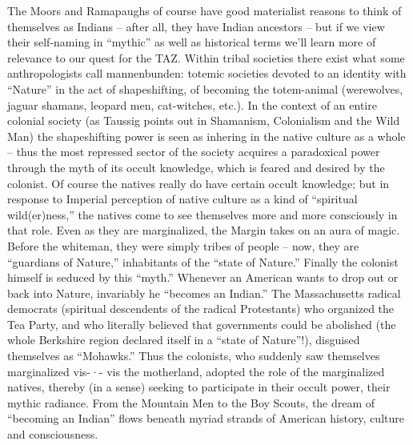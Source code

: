 \documentclass[a4paper,english,10pt,twoside]{article}
\begin{document}
\medskip
The Moors and Ramapaughs of course have good materialist reasons to think of themselves as Indians -- after all, they have Indian ancestors -- but if we view their self-naming in \enquote{mythic} as well as historical terms we'll learn more of relevance to our quest for the TAZ. Within tribal societies there exist what some anthropologists call mannenbunden: totemic societies devoted to an identity with \enquote{Nature} in the act of shapeshifting, of becoming the totem-animal (werewolves, jaguar shamans, leopard men, cat-witches, etc.). In the context of an entire colonial society (as Taussig points out in Shamanism, Colonialism and the Wild Man) the shapeshifting power is seen as inhering in the native culture as a whole --  thus the most repressed sector of the society acquires a paradoxical power through the myth of its occult knowledge, which is feared and desired by the colonist. Of course the natives really do have certain occult knowledge; but in response to Imperial perception of native culture as a kind of \enquote{spiritual wild(er)ness,} the natives come to see themselves more and more consciously in that role. Even as they are marginalized, the Margin takes on an aura of magic. Before the whiteman, they were simply tribes of people -- now, they are \enquote{guardians of Nature,} inhabitants of the \enquote{state of Nature.} Finally the colonist himself is seduced by this \enquote{myth.} Whenever an American wants to drop out or back into Nature, invariably he \enquote{becomes an Indian.} The Massachusetts radical democrats (spiritual descendents of the radical Protestants) who organized the Tea Party, and who literally believed that governments could be abolished (the whole Berkshire region declared itself in a \enquote{state of Nature}!), disguised themselves as \enquote{Mohawks.} Thus the colonists, who suddenly saw themselves marginalized vis-·- vis the motherland, adopted the role of the marginalized natives, thereby (in a sense) seeking to participate in their occult power, their mythic radiance. From the Mountain Men to the Boy Scouts, the dream of \enquote{becoming an Indian} flows beneath myriad strands of American history, culture and consciousness.
\end{document}
